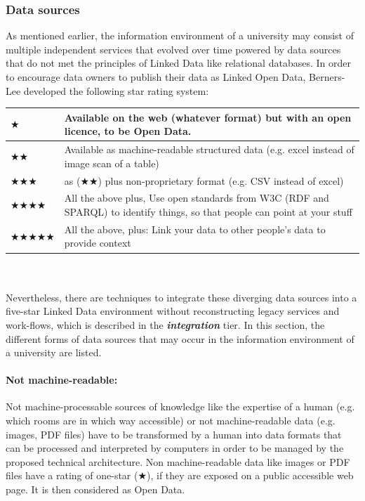 \documentclass{article}
\begin{document}
\subsubsection{Data sources}
\label{technical-architecture-challenges:proposal:data-source}
As mentioned earlier, the information environment of a university may consist of multiple independent services that evolved over time powered by data sources that do not met the principles of Linked Data like relational databases. In order to encourage data owners to publish their data as Linked Open Data, Berners-Lee developed the following star rating system: \cite{berners-lee_linked_2006}\\
\begin{tabular}{p{}  p{}}
		$\bigstar$ & Available on the web (whatever format) but with an open licence, to be Open Data. \\
		\hline
		$\bigstar\bigstar$ & Available as machine-readable structured data (e.g. excel instead of image scan of a table)\\
		\hline
		$\bigstar\bigstar\bigstar$ & as ($\bigstar\bigstar$) plus non-proprietary format (e.g. CSV instead of excel)\\
		\hline
		$\bigstar\bigstar\bigstar\bigstar$ & All the above plus, Use open standards from W3C (RDF and SPARQL) to identify things, so that people can point at your stuff\\
		\hline
		$\bigstar\bigstar\bigstar\bigstar\bigstar$ & All the above, plus: Link your data to other people’s data to provide context\\
\end{tabular}\\\\
Nevertheless, there are techniques to integrate these diverging data sources into a five-star Linked Data environment without reconstructing legacy services and work-flows, which is described in the \textbf{\textit{integration}} tier. In this section, the different forms of data sources that may occur in the information environment of a university are listed. 

\paragraph{Not machine-readable:} Not machine-processable sources of knowledge like the expertise of a human (e.g. which rooms are in which way accessible) or not machine-readable data (e.g. images, PDF files) have to be transformed by a human into data formats that can be processed and interpreted by computers in order to be managed by the proposed technical architecture. Non machine-readable data like images or PDF files have a rating of one-star ($\bigstar$), if they are exposed on a public accessible web page. It is then considered as Open Data.
\end{document}
